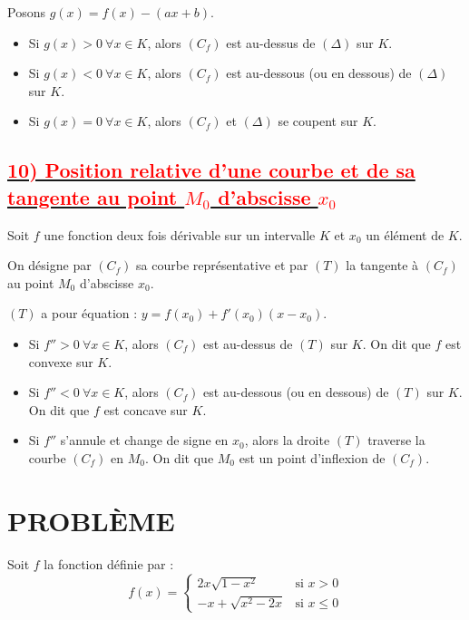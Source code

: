\documentclass[12pt]{article}
\begin{document}
Posons $g(x) = f(x) - (ax + b)$.

\begin{itemize}
    \item Si $g(x) > 0 \ \forall x \in K$, alors $(C_f)$ est au-dessus de $(\Delta)$ sur $K$.
    \item Si $g(x) < 0 \ \forall x \in K$, alors $(C_f)$ est au-dessous (ou en dessous) de $(\Delta)$ sur $K$.
    \item Si $g(x) = 0 \ \forall x \in K$, alors $(C_f)$ et $(\Delta)$ se coupent sur $K$.
\end{itemize}
\subsection*{\underline{\textbf{\textcolor{red}{10) Position relative d’une courbe et de sa tangente au point \( M_{0} \)  d'abscisse \( x_{0} \)}}}}

Soit $f$ une fonction deux fois dérivable sur un intervalle $K$ et $x_0$ un élément de $K$. 

On désigne par $(C_f)$ sa courbe représentative et par $(T)$ la tangente à $(C_f)$ au point $M_0$ d’abscisse $x_0$.

$(T)$ a pour équation : $y = f(x_0) + f'(x_0)(x - x_0)$.

\begin{itemize}
    \item Si $f'' > 0 \ \forall x \in K$, alors $(C_f)$ est au-dessus de $(T)$ sur $K$. On dit que $f$ est convexe sur $K$.
    \item Si $f'' < 0 \ \forall x \in K$, alors $(C_f)$ est au-dessous (ou en dessous) de $(T)$ sur $K$. On dit que $f$ est concave sur $K$.
    \item Si $f''$ s'annule et change de signe en $x_0$, alors la droite $(T)$ traverse la courbe $(C_f)$ en $M_0$. On dit que $M_0$ est un point d’inflexion de $(C_f)$.
\end{itemize}
\section*{PROBLÈME}

Soit $f$ la fonction définie par :
\[
f(x) =
\begin{cases} 
2x\sqrt{1 - x^2} & \text{si } x > 0 \\ 
-x + \sqrt{x^2 - 2x} & \text{si } x \leq 0 
\end{cases}
\]
\end{document}
